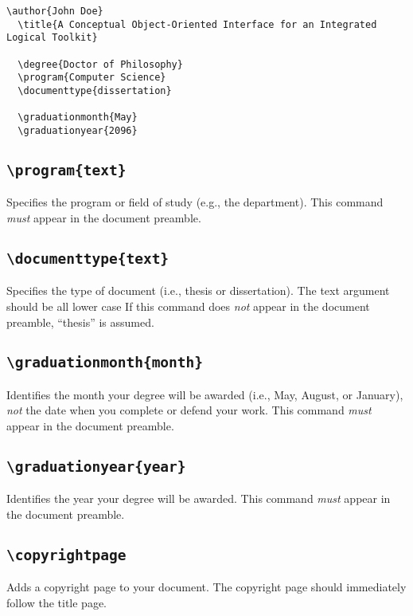 \documentclass[10pt]{article}
\newcommand{\command}[1]{\texttt{\textbackslash#1}}
\begin{document}
\begin{lstlisting}[gobble=2,float=h,caption={Sample document preamble showing the \command{degree}, \command{program}, \command{documenttype}, \command{graduationmonth}, and \command{graduationyear} commands.}]
  \author{John Doe}
  \title{A Conceptual Object-Oriented Interface for an Integrated Logical Toolkit}
  
  \degree{Doctor of Philosophy}
  \program{Computer Science}
  \documenttype{dissertation}
  
  \graduationmonth{May}
  \graduationyear{2096}
\end{lstlisting}

\subsection{\command{program\{text\}}}
Specifies the program or field of study (e.g., the department).
This command \emph{must} appear in the document preamble.

\subsection{\command{documenttype\{text\}}}
Specifies the type of document (i.e., thesis or dissertation).
The text argument should be all lower case
If this command does \emph{not} appear in the document preamble, ``thesis'' is assumed.

\subsection{\command{graduationmonth\{month\}}}
Identifies the month your degree will be awarded (i.e., May, August, or January), \emph{not} the date when you complete or defend your work.
This command \emph{must} appear in the document preamble.

\subsection{\command{graduationyear\{year\}}}
Identifies the year your degree will be awarded.
This command \emph{must} appear in the document preamble.

\subsection{\command{copyrightpage}}
Adds a copyright page to your document.
The copyright page should immediately follow the title page.
\end{document}

